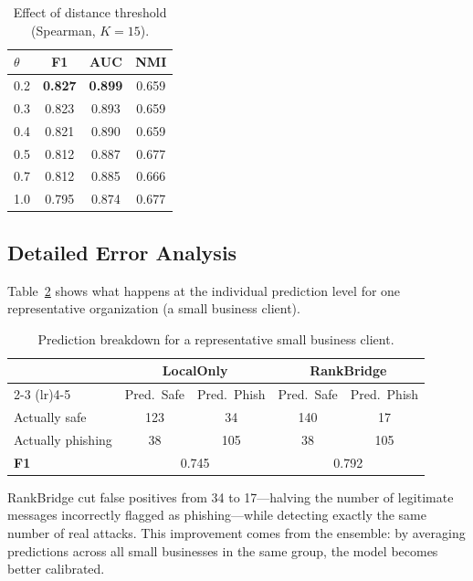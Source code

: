 \documentclass[information,article,submit,pdftex]{mdpi}
\begin{document}
\begin{table}[H]
\caption{Effect of distance threshold (Spearman, $K=15$).}\label{tab:ablation_threshold}
\begin{tabular}{lccc}
\toprule
$\theta$ & \textbf{F1} & \textbf{AUC} & \textbf{NMI} \\
\midrule
0.2 & \textbf{0.827} & \textbf{0.899} & 0.659 \\
0.3 & 0.823 & 0.893 & 0.659 \\
0.4 & 0.821 & 0.890 & 0.659 \\
0.5 & 0.812 & 0.887 & 0.677 \\
0.7 & 0.812 & 0.885 & 0.666 \\
1.0 & 0.795 & 0.874 & 0.677 \\
\bottomrule
\end{tabular}
\end{table}

\subsection{Detailed Error Analysis}

Table~\ref{tab:confusion} shows what happens at the individual prediction level
for one representative organization (a small business client).

\begin{table}[H]
\caption{Prediction breakdown for a representative small business
  client.}\label{tab:confusion}
\begin{tabular}{lcccc}
\toprule
& \multicolumn{2}{c}{\textbf{LocalOnly}} &
  \multicolumn{2}{c}{\textbf{RankBridge}} \\
\cmidrule(lr){2-3} \cmidrule(lr){4-5}
& Pred.\ Safe & Pred.\ Phish & Pred.\ Safe & Pred.\ Phish \\
\midrule
Actually safe     & 123 & 34 & 140 & 17 \\
Actually phishing & 38  & 105 & 38  & 105 \\
\midrule
\textbf{F1} & \multicolumn{2}{c}{0.745} & \multicolumn{2}{c}{0.792} \\
\bottomrule
\end{tabular}
\end{table}

RankBridge cut false positives from 34 to 17---halving the number of legitimate
messages incorrectly flagged as phishing---while detecting exactly the same number
of real attacks. This improvement comes from the ensemble: by averaging
predictions across all small businesses in the same group, the model becomes
better calibrated.
\end{document}

